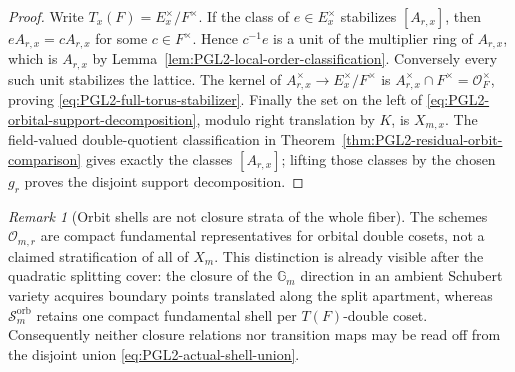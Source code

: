 \documentclass[11pt]{article}
\theoremstyle{definition}
\theoremstyle{remark}
\newtheorem{remark}[theorem]{Remark}
\begin{document}
\begin{proof}
Write $T_x(F)=E_x^\times/F^\times$.  If the class of $e\in E_x^\times$
stabilizes $[A_{r,x}]$, then
$eA_{r,x}=cA_{r,x}$ for some $c\in F^\times$.  Hence
$c^{-1}e$ is a unit of the multiplier ring of $A_{r,x}$, which is
$A_{r,x}$ by Lemma~\ref{lem:PGL2-local-order-classification}.  Conversely
every such unit stabilizes the lattice.  The kernel of
$A_{r,x}^\times\to E_x^\times/F^\times$ is
$A_{r,x}^\times\cap F^\times=\mathcal O_F^\times$, proving
\eqref{eq:PGL2-full-torus-stabilizer}.  Finally the set on the left of
\eqref{eq:PGL2-orbital-support-decomposition}, modulo right translation by
$K$, is $X_{m,x}$.  The field-valued double-quotient classification in
Theorem~\ref{thm:PGL2-residual-orbit-comparison} gives exactly the classes
$[A_{r,x}]$; lifting those classes by the chosen $g_r$ proves the disjoint
support decomposition.
\end{proof}

\begin{remark}[Orbit shells are not closure strata of the whole fiber]
The schemes $\mathscr O_{m,r}$ are compact fundamental representatives for
orbital double cosets, not a claimed stratification of all of $X_m$.  This
distinction is already visible after the quadratic splitting cover: the
closure of the $\mathbb G_m$ direction in an ambient Schubert variety acquires
boundary points translated along the split apartment, whereas
$\mathscr S_m^{\mathrm{orb}}$ retains one compact fundamental shell per
$T(F)$-double coset.  Consequently neither closure relations nor transition
maps may be read off from the disjoint union
\eqref{eq:PGL2-actual-shell-union}.
\end{remark}
\end{document}
